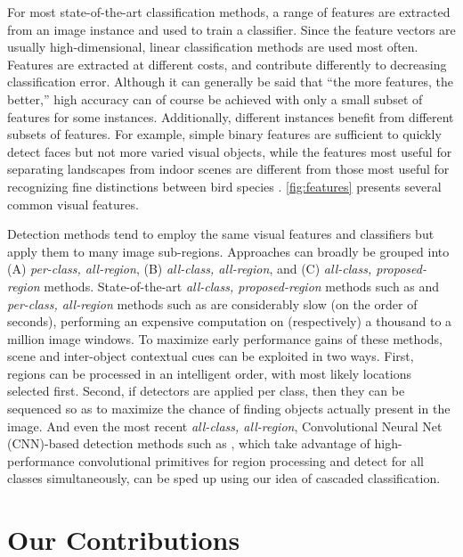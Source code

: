 For most state-of-the-art classification methods, a range of features are extracted from an image instance and used to train a classifier.
Since the feature vectors are usually high-dimensional, linear classification methods are used most often.
Features are extracted at different costs, and contribute differently to decreasing classification error.
Although it can generally be said that ``the more features, the better,'' high accuracy can of course be achieved with only a small subset of features for some instances.
Additionally, different instances benefit from different subsets of features.
For example, simple binary features are sufficient to quickly detect faces \parencite{Viola-IJCV-2004} but not more varied visual objects, while the features most useful for separating landscapes from indoor scenes \parencite{Xiao-CVPR-2010} are different from those most useful for recognizing fine distinctions between bird species \parencite{Farrell-ICCV-2011}.
\autoref{fig:features} presents several common visual features.

Detection methods tend to employ the same visual features and classifiers but apply them to many image sub-regions.
Approaches can broadly be grouped into (A) \emph{per-class, all-region}, (B) \emph{all-class, all-region}, and (C) \emph{all-class, proposed-region} methods.
State-of-the-art \emph{all-class, proposed-region} methods such as \cite{Girshick-CVPR-2014} and \emph{per-class, all-region} methods such as \cite{Felzenszwalb2010a} are considerably slow (on the order of seconds), performing an expensive computation on (respectively) a thousand to a million image windows.
To maximize early performance gains of these methods, scene and inter-object contextual cues can be exploited in two ways.
First, regions can be processed in an intelligent order, with most likely locations selected first.
Second, if detectors are applied per class, then they can be sequenced so as to maximize the chance of finding objects actually present in the image.
And even the most recent \emph{all-class, all-region}, Convolutional Neural Net (CNN)-based detection methods such as \cite{He-ECCV-2014}, which take advantage of high-performance convolutional primitives for region processing and detect for all classes simultaneously, can be sped up using our idea of cascaded classification.

\section{Our Contributions}

